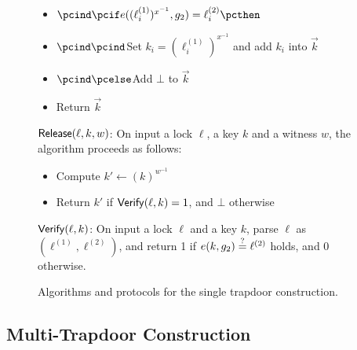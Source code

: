 \begin{figure*}[htb]
\begin{center}
{\begin{minipage}[t]{0.75\textwidth}
\begin{itemize}[label=-]
				\item $\pcind \pcif e((\ell_i^{(1)})^{x^{-1}}, g_2) = \ell_i^{(2)} \pcthen$
				\item $\pcind \pcind$Set $k_i = (\ell_i^{(1)})^{x^{-1}}$ and add $k_i$ into $
				\vec{k}$
				\item $\pcind \pcelse$Add $\bot$ to $\vec{k}$\
				\item Return $\vec{k}$
			\end{itemize}
			\underline{$\mathsf{Release}(\ell, k, w)$}: On input a lock $\ell$, a key $k$ and 
			a witness $w$, the algorithm proceeds as follows:
			\begin{itemize}
				\item Compute $k' \gets (k)^{w^{-1}}$
				\item Return $k'$ if $\mathsf{Verify}(\ell, k) = 1$, and $\bot$ otherwise
			\end{itemize}
			\underline{$\mathsf{Verify}(\ell, k)$}: On input a lock $\ell$ and a key $k$, 
			parse $\ell$ as $(\ell^{(1)}, \ell^{(2)})$, and return 1 if $e(k, g_2) \stackrel{?}{=} 
			\ell^{(2)}$ holds, and 0 otherwise.
		\end{minipage}
	}
	\end{center}
	
	\caption{Algorithms and protocols for the single trapdoor construction.}
	\label{fig:single-trapdoor}
\end{figure*}


\subsection{Multi-Trapdoor Construction}

